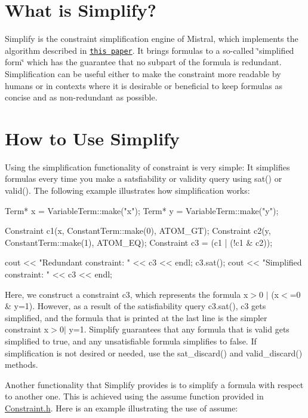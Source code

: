  \hypertarget{simplify_simplify-intro}{}\section{\-What is Simplify?}\label{simplify_simplify-intro}
\-Simplify is the constraint simplification engine of \-Mistral, which implements the algorithm described in \href{http://www.cs.wm.edu/~idillig/sas2010.pdf}{\tt this paper}. \-It brings formulas to a so-\/called \char`\"{}simplified form\char`\"{} which has the guarantee that no subpart of the formula is redundant. \-Simplification can be useful either to make the constraint more readable by humans or in contexts where it is desirable or beneficial to keep formulas as concise and as non-\/redundant as possible.\hypertarget{simplify_use-simplify}{}\section{\-How to Use Simplify}\label{simplify_use-simplify}
\-Using the simplification functionality of constraint is very simple\-: \-It simplifies formulas every time you make a satsfiability or validity query using sat() or valid(). \-The following example illustrates how simplification works\-:

\begin{DoxyVerb}
     Term* x = VariableTerm::make("x");
     Term* y = VariableTerm::make("y");

     Constraint c1(x, ConstantTerm::make(0), ATOM_GT);
     Constraint c2(y, ConstantTerm::make(1), ATOM_EQ);
     Constraint c3 = (c1 | (!c1 & c2));

     cout << "Redundant constraint: " << c3 << endl;
     c3.sat();
     cout << "Simplified constraint: " << c3 << endl;
    \end{DoxyVerb}


\-Here, we construct a constraint c3, which represents the formula x$>$0 $|$ (x$<$=0 \& y=1). \-However, as a result of the satisfiability query c3.\-sat(), c3 gets simplified, and the formula that is printed at the last line is the simpler constraint x$>$0$|$ y=1. \-Simplify guarantees that any formula that is valid gets simplified to true, and any unsatisfiable formula simplifies to false. \-If simplification is not desired or needed, use the sat\-\_\-discard() and valid\-\_\-discard() methods.

\-Another functionality that \-Simplify provides is to simplify a formula with respect to another one. \-This is achieved using the assume function provided in \hyperlink{Constraint_8h_source}{\-Constraint.\-h}. \-Here is an example illustrating the use of assume\-:

